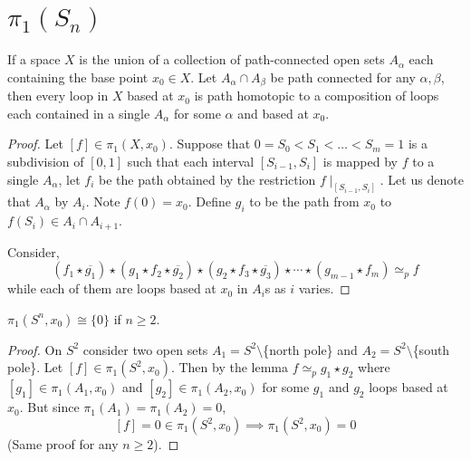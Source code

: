 \documentclass[12pt]{amsart}
\begin{document}
\newpage 
\section{$\pi_1(S_n)$}

\begin{lemma}
    If a space $X$ is the union of a collection of path-connected open sets $A_\alpha$ each containing the base point $x_0 \in X$. Let $A_\alpha \cap A_\beta$ be path connected for any $\alpha, \beta$, then every loop in $X$ based at $x_0$ is path homotopic to a composition of loops each contained in a single $A_\alpha$ for some $\alpha$ and based at $x_0$. 
\end{lemma}

\begin{proof}
    Let $[f] \in \pi_1(X, x_0)$. Suppose that $0 = S_0 < S_1 < \ldots < S_m = 1$ is a subdivision of $[0,1]$ such that each interval ${[S_{i-1}, S_i]}$ is mapped by $f$ to a single $A_\alpha$, let $f_i$ be the path obtained by the restriction $f \mid_{[S_{i-1}, S_i]}$. Let us denote that $A_\alpha$ by $A_i$. 
    Note $f(0) = x_0$. Define $g_i$ to be the path from $x_0$ to $f(S_i) \in A_i \cap A_{i+1}$. 
    
    
    Consider, 
    \[(f_1 \star \overline{g_1}) \star (g_1 \star f_2 \star \overline{g_2}) \star (g_2 \star f_3 \star \overline{g_3}) \star \cdots \star (g_{m-1} \star f_m) \simeq_p f\]
    while each of them are loops based at $x_0$ in $A_i$s as $i$ varies. 
\end{proof}

\begin{theorem}
    $\pi_1 (S^n, x_0) \cong \{0\}$ if $n \geq 2$. 
\end{theorem}

\begin{proof}
    On $S^2$ consider two open sets $A_1 = S^2 \setminus$\{north pole\} and $A_2 = S^2\setminus$\{south pole\}. Let $[f] \in \pi_1 (S^2, x_0)$. Then by the lemma $f \simeq_p g_1 \star g_2$ where $[g_1] \in \pi_1(A_1, x_0)$ and  $[g_2] \in \pi_1(A_2, x_0)$ for some $g_1$ and $g_2$ loops based at $x_0$. But since $\pi_1(A_1) = \pi_1(A_2) = 0$, 
    \[[f] = 0 \in \pi_1(S^2, x_0) \implies \pi_1(S^2, x_0) = 0\]
    (Same proof for any $n \geq 2$). 
\end{proof}
\end{document}
